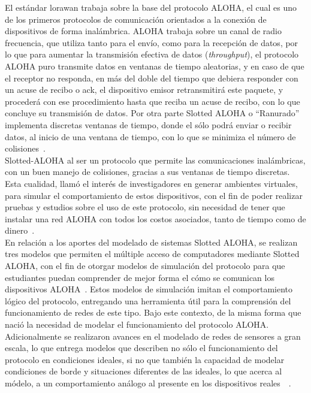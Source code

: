 \begin{justify}
El estándar \gls{lorawan} trabaja sobre la base del protocolo ALOHA, el cual es uno de los primeros protocolos de comunicación orientados a la conexión de dispositivos de forma inalámbrica. ALOHA trabaja sobre un canal de radio frecuencia, que utiliza tanto para el envío, como para la recepción de datos, por lo que para aumentar la transmisión efectiva de datos (\textit{throughput}), el protocolo ALOHA puro transmite datos en ventanas de tiempo aleatorias, y en caso de que el receptor no responda, en más del doble del tiempo que debiera responder con un acuse de recibo o \gls{ack}, el dispositivo emisor retransmitirá este paquete, y procederá con ese procedimiento hasta que reciba un acuse de recibo, con lo que concluye su transmisión de datos. Por otra parte Slotted ALOHA  o ``Ranurado'' implementa discretas ventanas de tiempo, donde el sólo podrá enviar o recibir datos, al inicio de una ventana de tiempo, con lo que se minimiza el número de colisiones~\cite{NORMAN}.\\
Slotted-ALOHA al ser un protocolo que permite las comunicaciones inalámbricas, con un buen manejo de colisiones, gracias a sus ventanas de tiempo discretas. Esta cualidad, llamó el interés de investigadores en generar ambientes virtuales, para simular el comportamiento de estos dispositivos, con el fin de poder realizar pruebas y estudios sobre el uso de este protocolo, sin necesidad de tener que instalar una red ALOHA con todos los costos asociados, tanto de tiempo como de dinero~\cite{Abdullah}.\\
En relación a los aportes del modelado de sistemas Slotted ALOHA, se realizan tres modelos que permiten el múltiple acceso de computadores mediante Slotted ALOHA, con el fin de otorgar modelos de simulación del protocolo para que estudiantes puedan comprender de mejor forma el cómo se comunican los dispositivos ALOHA~\cite{Abdullah}. Estos modelos de simulación imitan el comportamiento lógico del protocolo, entregando una herramienta útil para la comprensión del funcionamiento de redes de este tipo. Bajo este contexto, de la misma forma que nació la necesidad de modelar el funcionamiento del protocolo ALOHA. Adicionalmente se realizaron avances en el modelado de redes de sensores a gran escala, lo que entrega modelos que describen no sólo el funcionamiento del protocolo en condiciones ideales, si no que también la capacidad de modelar condiciones de borde y situaciones diferentes de las ideales, lo que acerca al módelo, a un comportamiento análogo al presente en los dispositivos reales~\cite{simulato}~\cite{simubook}.\\

\end{justify}
